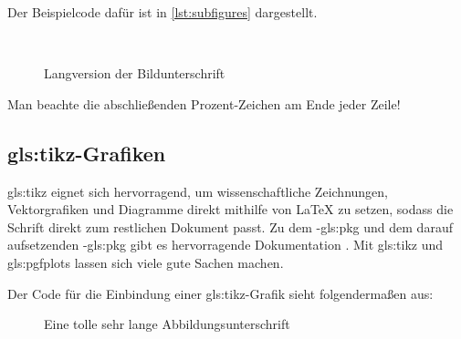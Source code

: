 Der Beispielcode dafür ist in \cref{lst:subfigures} dargestellt.

\begin{latex}[caption={Unterabbildungen in LaTeX},label={lst:subfigures}]
\begin{figure}[h]%
	\centering%
	\hfill%
	\\%
	\hfill%
\caption[Kurzversion]{Langversion der Bildunterschrift}%
\label{fig:MeinGanzesBild}%
\end{figure}
\end{latex}

Man beachte die abschließenden Prozent-Zeichen am Ende jeder Zeile!

\subsection[TikZ-Grafiken]{\gls{gls:tikz}-Grafiken}%
\label{sec:TikZ}
%
\Gls{gls:tikz} eignet sich hervorragend, um wissenschaftliche Zeichnungen,
Vektorgrafiken und Diagramme direkt mithilfe von LaTeX
zu setzen, sodass die Schrift direkt zum restlichen Dokument passt.
Zu dem -\gls{gls:pkg} und dem darauf aufsetzenden -\gls{gls:pkg} gibt
es hervorragende Dokumentation \parencites{Tantau2013}{Feuersaenger2014}.
Mit \gls{gls:tikz} und \gls{gls:pgfplots} lassen sich viele gute Sachen machen.


Der Code für die Einbindung einer \gls{gls:tikz}-Grafik sieht folgendermaßen aus:
\begin{latex}[caption={Einbindung einer TikZ-Zeichnung in LaTeX},label={lst:tikz-figure}]
\begin{figure}[h]%
  \centering%
  \resizebox{\textwidth}{!}{%
  }%
  \caption[Kurzversion für das Abbildungsverzeichnis]{%
           Eine tolle sehr lange Abbildungsunterschrift}%
  \label{fig:my-tikz-figure}%
\end{figure}
\end{latex}

